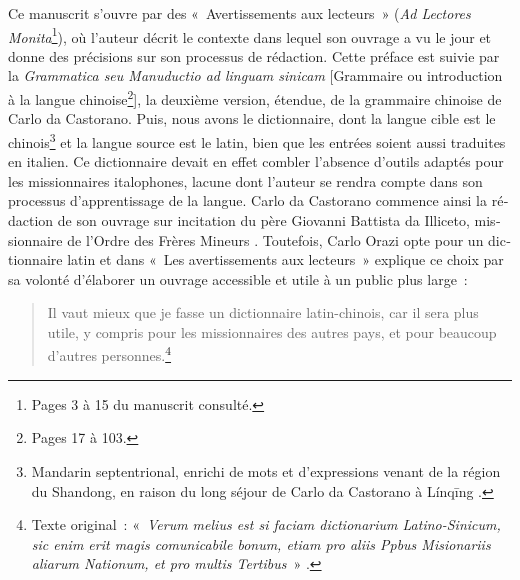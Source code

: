 \documentclass[output=paper,colorlinks,citecolor=brown,arabicfont,chinesefont,booklanguage=french]{langscibook}
\begin{document}
\begin{otherlanguage}{french}
Ce manuscrit s’ouvre par des «~Avertissements aux lecteurs~» (\emph{Ad Lectores Monita}\footnote{Pages 3 à 15 du manuscrit consulté.}), où l’auteur décrit le contexte dans lequel son ouvrage a vu le jour et donne des précisions sur son processus de rédaction. Cette préface est suivie par la \emph{Grammatica seu Manuductio ad linguam sinicam} [Grammaire ou introduction à la langue chinoise\footnote{Pages 17 à 103.}], la deuxième version, étendue, de la grammaire chinoise de Carlo da Castorano. Puis, nous avons le dictionnaire, dont la langue cible est le chinois\footnote{Mandarin septentrional, enrichi de mots et d’expressions venant de la région du Shandong, en raison du long séjour de Carlo da Castorano à Línqīng {} \citet[177]{Li2017}.} et la langue source est le latin, bien que les entrées soient aussi traduites en italien. Ce dictionnaire devait en effet combler l’absence d’outils adaptés pour les missionnaires italophones, lacune dont l’auteur se rendra compte dans son processus d’apprentissage de la langue. Carlo da Castorano commence ainsi la rédaction de son ouvrage sur incitation du père Giovanni Battista da Illiceto, missionnaire de l’Ordre des Frères Mineurs \citep[178]{Li2017}. Toutefois, Carlo Orazi opte pour un dictionnaire latin et dans «~Les avertissements aux lecteurs~» explique ce choix par sa volonté d’élaborer un ouvrage accessible et utile à un public plus large~:

\begin{quote}
    Il vaut mieux que je fasse un dictionnaire latin-chinois, car il sera plus utile, y compris pour les missionnaires des autres pays, et pour beaucoup d’autres personnes.\footnote{Texte original~: «~\emph{Verum melius est si faciam dictionarium Latino-Sinicum, sic enim erit magis comunicabile bonum, etiam pro aliis Ppbus Misionariis aliarum Nationum, et pro multis Tertibus}~» \citet[f. 4]{Orazi1732}.}
\end{quote}


\end{otherlanguage}
\end{document}
